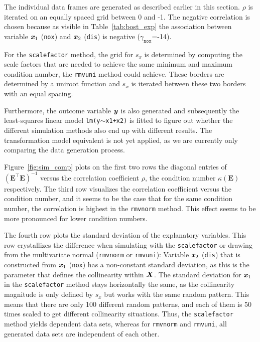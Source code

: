 \documentclass[11pt,a4paper,twoside]{book}\usepackage[]{graphicx}\usepackage[]{xcolor}
\begin{document}
The individual data frames are generated as described earlier in this section. $\rho$ is iterated on an equally spaced grid between 0 and -1. The negative correlation is chosen because as visible in Table~\ref{tab:bost_exp} the association between variable ${\textbf{\textit{x}}}_1$ (\texttt{nox}) and ${\textbf{\textit{x}}}_2$ (\texttt{dis}) is negative ($\gamma_\texttt{nox}$=-14).

For the \texttt{scalefactor} method, the grid for $s_x$ is determined by computing the scale factors that are needed to achieve the same minimum and maximum condition number, the \texttt{rmvuni} method could achieve. These borders are determined by a uniroot function and $s_x$ is iterated between these two borders with an equal spacing.

Furthermore, the outcome variable ${\textbf{\textit{y}}}$ is also generated and subsequently the least-squares linear model \texttt{lm(y$\sim$x1+x2)} is fitted to figure out whether the different simulation methods also end up with different results. The transformation model equivalent is not yet applied, as we are currently only comparing the data generation process.

Figure~\ref{fig:sim_comp} plots on the first two rows the diagonal entries of $\left(\boldsymbol{E^\top E}\right)^{-1}$ versus the correlation coefficient $\rho$, the condition number $\kappa\left(\boldsymbol{E}\right)$ respectively. The third row visualizes the correlation coefficient versus the condition number, and it seems to be the case that for the same condition number, the correlation is highest in the \texttt{rmvnorm} method. This effect seems to be more pronounced for lower condition numbers.

The fourth row plots the standard deviation of the explanatory variables.
This row crystallizes the difference when simulating with the \texttt{scalefactor} or drawing from the multivariate normal (\texttt{rmvnorm} or \texttt{rmvuni}): Variable ${\textbf{\textit{x}}}_2$ (\texttt{dis}) that is constructed from ${\textbf{\textit{x}}}_1$ (\texttt{nox}) has a non-constant standard deviation, as this is the parameter that defines the collinearity within ${\boldsymbol{X}}$.
The standard deviation for ${\textbf{\textit{x}}}_1$ in the \texttt{scalefactor} method stays horizontally the same, as the collinearity magnitude is only defined by $s_x$ but works with the same random pattern. This means that there are only 100 different random patterns, and each of them is 50 times scaled to get different collinearity situations. Thus, the \texttt{scalefactor} method yields dependent data sets, whereas for \texttt{rmvnorm} and \texttt{rmvuni}, all generated data sets are independent of each other.
\end{document}
